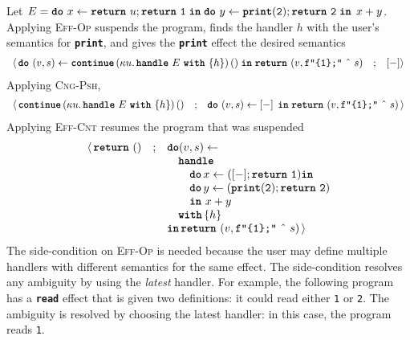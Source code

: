 Let $E = \texttt{\textbf{do}} \,\, {x} \leftarrow {\texttt{\textbf{return}} \,\, {u};\texttt{\textbf{return}} \,\, {\texttt{1}}} \; \textbf{\texttt{in}} \; {{\texttt{\textbf{do}} \,\, {y} \leftarrow {\texttt{\textbf{print}}(\texttt{2});\texttt{\textbf{return}} \,\, {\texttt{2}}} \; \textbf{\texttt{in}} \; {\, x + y}}}$. Applying \textsc{Eff-Op} suspends the program, finds the handler $h$ with the user's semantics for \textbf{\texttt{print}}, and gives the \textbf{\texttt{print}} effect the desired semantics
{  \arraycolsep=3pt
\small
\[\begin{array}{rcl}
  \langle \, \texttt{\textbf{do}} \,\, {(v, s)} \leftarrow {\textbf{\texttt{continue}} \, {(\kappa{} u. \, \textbf{\texttt{handle}} \,\, {E} \,\, \textbf{\texttt{with}} \,\, \{{h}\})} \, {()}} \; \textbf{\texttt{in}} \; {\texttt{\textbf{return}} \,\, {(v, \texttt{f"\{1\};"} \text{ \^\ } s)}} &;& [-] \rangle
\end{array}
  \]
}
Applying \textsc{Cng-Psh},
{  \arraycolsep=3pt
\small
\[\begin{array}{rcl}
  \langle \, \textbf{\texttt{continue}} \, {(\kappa{} u. \, \textbf{\texttt{handle}} \,\, {E} \,\, \textbf{\texttt{with}} \,\, \{{h}\})} \, {()} &;& \texttt{\textbf{do}} \,\, {(v, s)} \leftarrow {[-]\,} \; \textbf{\texttt{in}} \; {\texttt{\textbf{return}} \,\, {(v, \texttt{f"\{1\};"} \text{ \^\ } s)}}\, \rangle
\end{array}
  \]
}
Applying \textsc{Eff-Cnt} resumes the program that was suspended
{  \arraycolsep=3pt
\small
\[\begin{array}{rcl}
  \langle \, \texttt{\textbf{return}} \,\, {()} &;& \textbf{\texttt{do}} {(v, s)} \leftarrow \\
  && \quad \textbf{\texttt{handle}} \\
  && \quad \quad \textbf{\texttt{do}} \, x \leftarrow ([-];\texttt{\textbf{return}} \,\, {\texttt{1}}) \textbf{\texttt{in}}\\
  && \quad \quad \textbf{\texttt{do}} \, y \leftarrow (\texttt{\textbf{print}}(\texttt{2});\texttt{\textbf{return}} \,\, {\texttt{2}})\\
  && \quad\quad \textbf{\texttt{in}} \, {\, x + y}\\
  && \quad \textbf{\texttt{with}} \, \{ h \}\\
  && \textbf{\texttt{in}} \, \texttt{\textbf{return}} \,\, {(v, \texttt{f"\{1\};"} \text{ \^\ } s)}  \, \rangle
\end{array}
  \]
}
The side-condition on \textsc{Eff-Op} is needed because the user may define multiple handlers with different semantics for the same effect. The side-condition resolves any ambiguity by using the \textit{latest} handler. For example, the following program has a \textbf{\texttt{read}} effect that is given two definitions: it could read either \texttt{1} or \texttt{2}. The ambiguity is resolved by choosing the latest handler: in this case, the program reads \texttt{1}.
